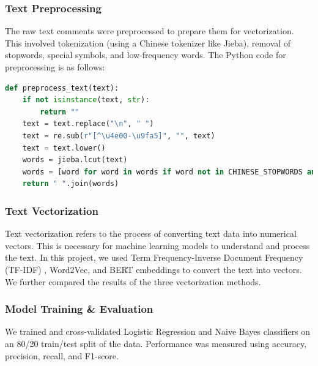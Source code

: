 \documentclass{article}
\begin{document}
\subsubsection{Text Preprocessing}
\label{sssec:preprocessing}
The raw text comments were preprocessed to prepare them for vectorization. 
This involved tokenization (using a Chinese tokenizer like Jieba), removal of stopwords, special symbols, 
and low-frequency words.
The Python code for preprocessing is as follows:
\begin{lstlisting}[language=Python]
def preprocess_text(text):
    if not isinstance(text, str):
        return ""
    text = text.replace("\n", " ")
    text = re.sub(r"[^\u4e00-\u9fa5]", "", text)
    text = text.lower()
    words = jieba.lcut(text)
    words = [word for word in words if word not in CHINESE_STOPWORDS and len(word) > 1]
    return " ".join(words)
\end{lstlisting}

\subsubsection{Text Vectorization}
\label{sssec:vectorization}
Text vectorization refers to the process of converting text data into numerical vectors. 
This is necessary for machine learning models to understand and process the text. 
In this project, we used Term Frequency-Inverse Document Frequency (TF-IDF) , Word2Vec, and BERT embeddings 
to convert the text into vectors. We further compared the results of the three vectorization methods.


\subsubsection{Model Training \& Evaluation}
\label{sssec:ml_training}
We trained and cross-validated Logistic Regression and Naive Bayes classifiers on an 80/20 train/test 
split of the data. Performance was measured using accuracy, precision, recall, and F1-score.
\end{document}
